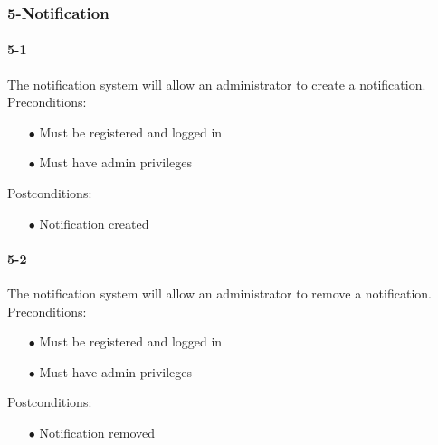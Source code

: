 \documentclass[a4paper,12pt]{article}
\begin{document}
\subsubsection{5-Notification}

\paragraph{5-1}
The notification system will allow an administrator to create a notification.\\
Preconditions:
\begin{itemize}
	\item[$\bullet$] Must be registered and logged in
	\item[$\bullet$] Must have admin privileges
\end{itemize}
Postconditions:
\begin{itemize}
	\item[$\bullet$] Notification created
\end{itemize}
\paragraph{5-2}
The notification system will allow an administrator to remove a notification.\\
Preconditions:
\begin{itemize}
	\item[$\bullet$] Must be registered and logged in
	\item[$\bullet$] Must have admin privileges
\end{itemize}
Postconditions:
\begin{itemize}
	\item[$\bullet$] Notification removed
\end{itemize}
\end{document}
